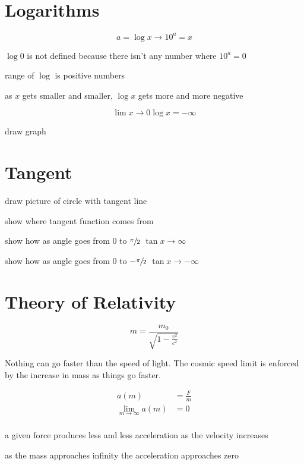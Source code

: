 \documentclass[letterpaper, landscape]{exam}
\begin{document}
  \section{Logarithms}
  \[
    a = \log x \rightarrow 10^a = x
  \]

  \begin{itemize*}
    \item $\log 0$ is not defined because there isn't any number where
      $10^a = 0$
    \item range of $\log$ is positive numbers
    \item as $x$ gets smaller and smaller, $\log x$ gets more and more negative
  \end{itemize*}

  \[
    \lim{x \to 0} \log x = -\infty
  \]

  draw graph

  \section{Tangent}

  \begin{itemize*}
    \item draw picture of circle with tangent line
    \item show where tangent function comes from
    \item show how as angle goes from 0 to $\sfrac{\pi}{2}$ 
      $\tan x \rightarrow \infty$
    \item show how as angle goes from 0 to $- \sfrac{\pi}{2}$ 
      $\tan x \rightarrow -\infty$
  \end{itemize*}

  \section{Theory of Relativity}

  \[
    m = \frac{m_0}{\sqrt{1 - \frac{v^2}{c^2}}}
  \]

  Nothing can go faster than the speed of light. The cosmic speed limit is
  enforced by the increase in mass as things go faster.

  \begin{align*}
    a(m)                     & = \frac{F}{m} \\
    \lim_{m \to \infty} a(m) & = 0 \\
  \end{align*}

  \begin{itemize*}
    \item a given force produces less and less acceleration as the velocity
      increases
    \item as the mass approaches infinity the acceleration approaches zero
  \end{itemize*}
\end{document}
